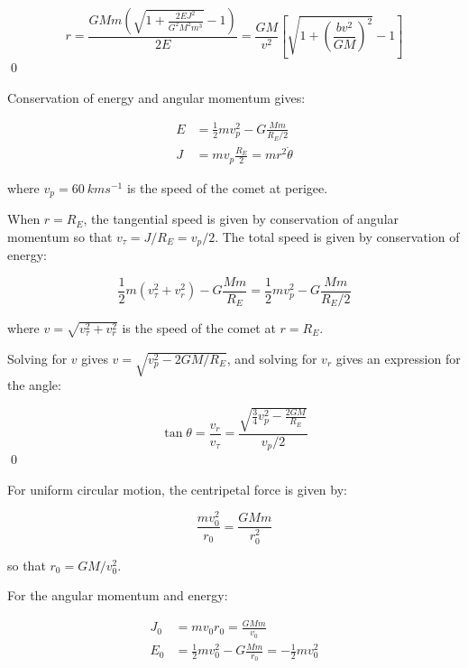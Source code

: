 \documentclass[12pt]{article}
\begin{document}
\begin{equation}
    r = \frac{GMm (\sqrt{1 + \frac{2EJ^{2}}{G^{2}M^{2}m^{3}}} - 1)}{2E} = \frac{GM}{v^{2}} \left[ \sqrt{1 + \left( \frac{bv^{2}}{GM} \right)^{2}} - 1 \right]
\end{equation}
\qed


Conservation of energy and angular momentum gives:

\begin{equation}
\begin{split}
    E &= \frac{1}{2} m v_{p}^{2} - G \frac{Mm}{R_{E}/2} \\
    J &= mv_{p} \frac{R_{E}}{2} = m r^{2} \dot{\theta}
\end{split}
\end{equation}

where $v_{p} = \qty{60}{km s^{-1}}$ is the speed of the comet at perigee.

When $r = R_{E}$, the tangential speed is given by conservation of angular momentum so that $v_{\tau} = J/R_{E} = v_{p}/2$. The total speed is given by conservation of energy:

\begin{equation}
    \frac{1}{2} m (v_{\tau}^{2} + v_{r}^{2}) - G \frac{Mm}{R_{E}} = \frac{1}{2} m v_{p}^{2} - G \frac{Mm}{R_{E}/2}
\end{equation}

where $v = \sqrt{v_{\tau}^{2} + v_{r}^{2}}$ is the speed of the comet at $r = R_{E}$.

Solving for $v$ gives $v = \sqrt{v_{p}^{2} - 2GM/R_{E}}$, and solving for $v_{r}$ gives an expression for the angle:

\begin{equation}
    \tan{\theta} = \frac{v_{r}}{v_{\tau}} = \frac{\sqrt{\frac{3}{4} v_{p}^{2} - \frac{2GM}{R_{E}}}}{{v_{p}/2}}
\end{equation}
\qed



For uniform circular motion, the centripetal force is given by:

\begin{equation}
    \frac{mv_{0}^{2}}{r_{0}} = \frac{GMm}{r_{0}^{2}}
\end{equation}

so that $r_{0} = GM/v_{0}^{2}$.

For the angular momentum and energy:

\begin{equation}
\begin{split}
    J_{0} &= mv_{0}r_{0} = \frac{GMm}{v_{0}} \\
    E_{0} &= \frac{1}{2} m v_{0}^{2} - G \frac{Mm}{r_{0}} = -\frac{1}{2} m v_{0}^{2}
\end{split}
\end{equation}
\end{document}
